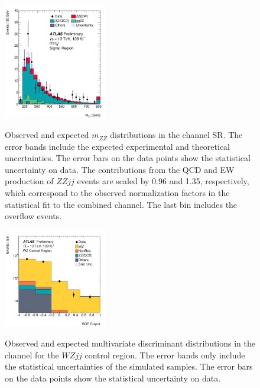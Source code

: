 \begin{figure}[!htbp]
\begin{center}
\includegraphics[width=0.4\textwidth]{figures/4l/MZZ_4l_SR_v1.pdf} \\
\end{center}
\caption{Observed and expected $m_{ZZ}$ distributions in the \lllljj channel SR. 
        The error bands include the expected experimental and theoretical uncertainties.
        The error bars on the data points show the statistical uncertainty on data.
        The contributions from the QCD and EW production of $ZZjj$ events are scaled by 0.96 and 1.35, respectively, 
        which correspond to the observed normalization factors in the statistical fit to the combined channel.
        The last bin includes the overflow events.
        }
\label{fig:mZZ}
\end{figure}

\begin{figure}[!htbp]
\begin{center}
\includegraphics[width=0.4\textwidth]{figures/llvv/BDT_2l2v_3lCR.pdf} \\
\end{center}
\caption{Observed and expected multivariate discriminant distributions in the \llvvjj channel for 
        the $WZjj$
        control region.
        The error bands only include the statistical uncertainties of the simulated samples.
        The error bars on the data points show the statistical uncertainty on data.
        }
\label{fig:MVA_2l2v_CR}
\end{figure}

